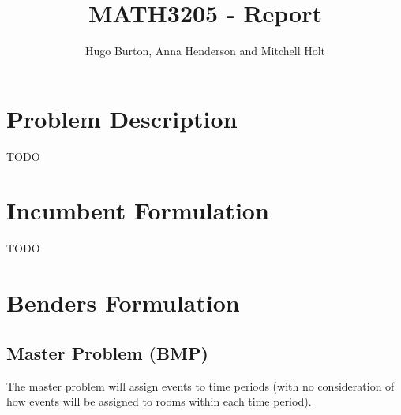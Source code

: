 \documentclass{article}
\title{MATH3205 - Report}
\author{Hugo Burton, Anna Henderson and Mitchell Holt}
\theoremstyle{plain}
\numberwithin{theorem}{section}
\numberwithin{example}{section}
\theoremstyle{definition}
\begin{document}
\maketitle

\tableofcontents

\newpage

\section{Problem Description}
TODO

\section{Incumbent Formulation}
TODO

\section{Benders Formulation}
\subsection{Master Problem (BMP)}
The master problem will assign events to time periods (with no consideration of
how events will be assigned to rooms within each time period).
\end{document}
